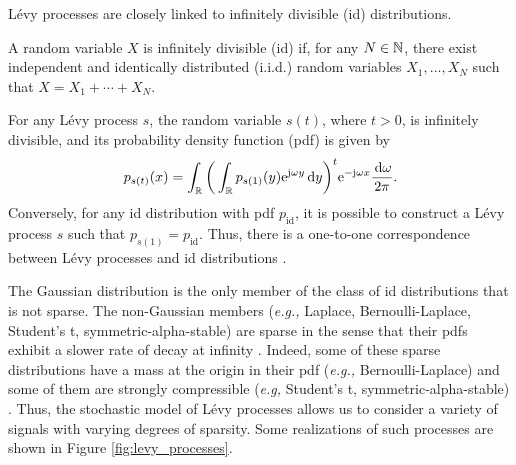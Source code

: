 \documentclass[journal]{IEEEtran}
\begin{document}
L\'{e}vy processes are closely linked to infinitely divisible (id) distributions.

\begin{definition}
    A random variable $X$ is infinitely divisible (id) if, for any $N \in \mathbb{N}$, there exist independent and identically distributed (i.i.d.) random variables $X_1, \ldots, X_N$ such that $X = X_1 + \cdots + X_N$.
\end{definition}

For any L\'{e}vy process $s$, the random variable $s(t)$, where $t>0$, is infinitely divisible, and its probability density function (pdf) is given by
\begin{equation}
    p_{s(t)}(x) = \int_{\mathbb{R}} \bigg(\int_{\mathbb{R}} p_{s(1)}(y) \mathrm{e}^{\mathrm{j} \omega y} \,\mathrm{d} y \bigg)^t \mathrm{e}^{-\mathrm{j} \omega x} \frac{\,\mathrm{d} \omega}{2\pi}.
\end{equation}
Conversely, for any id distribution with pdf $p_{\text{id}}$, it is possible to construct a L\'{e}vy process $s$ such that $p_{s(1)} = p_{\text{id}}$. Thus, there is a one-to-one correspondence between L\'{e}vy processes and id distributions \cite{ken1999levy}.

The Gaussian distribution is the only member of the class of id distributions that is not sparse. The non-Gaussian members (\textit{e.g.,} Laplace, Bernoulli-Laplace, Student's t, symmetric-alpha-stable) are sparse in the sense that their pdfs exhibit a slower rate of decay at infinity \cite{amini2014sparsity}. Indeed, some of these sparse distributions have a mass at the origin in their pdf (\textit{e.g.,} Bernoulli-Laplace) and some of them are strongly compressible (\textit{e.g,} Student's t, symmetric-alpha-stable) \cite{amini2011compressibility}. Thus, the stochastic model of L\'{e}vy processes allows us to consider a variety of signals with varying degrees of sparsity. Some realizations of such processes are shown in Figure \ref{fig:levy_processes}.
\end{document}
